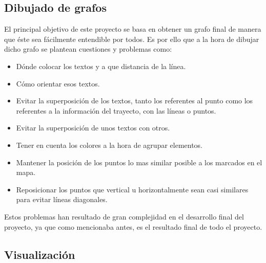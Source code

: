 \subsection{Dibujado de grafos}
El principal objetivo de este proyecto se basa en obtener un grafo final de manera que éste sea fácilmente entendible por todos. Es por ello que a la hora de dibujar dicho grafo se plantean cuestiones y problemas como:
\begin{itemize}
	\item Dónde colocar los textos y a que distancia de la línea.
	\item Cómo orientar esos textos.
	\item Evitar la superposición de los textos, tanto los referentes al punto como los referentes a la información del trayecto, con las líneas o puntos.
	\item Evitar la superposición de unos textos con otros.
	\item Tener en cuenta los colores a la hora de agrupar elementos.
	\item Mantener la posición de los puntos lo mas similar posible a los marcados en el mapa.
	\item Reposicionar los puntos que vertical u horizontalmente sean casi similares para evitar líneas diagonales.
\end{itemize}

Estos problemas han resultado de gran complejidad en el desarrollo final del proyecto, ya que como mencionaba antes, es el resultado final de todo el proyecto.


\subsection{Visualización}